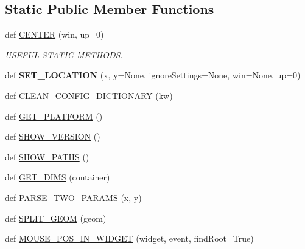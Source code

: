 \subsection*{Static Public Member Functions}
\begin{DoxyCompactItemize}
\item 
\mbox{\label{class_python_01_g_u_i_1_1appjar_1_1gui_ad5cb3ccb338fa2926c49bf320651215c}} 
def \hyperlink{class_python_01_g_u_i_1_1appjar_1_1gui_ad5cb3ccb338fa2926c49bf320651215c}{C\+E\+N\+T\+ER} (win, up=0)
\begin{DoxyCompactList}\small\item\em U\+S\+E\+F\+UL S\+T\+A\+T\+IC M\+E\+T\+H\+O\+DS. \end{DoxyCompactList}\item 
\mbox{\label{class_python_01_g_u_i_1_1appjar_1_1gui_ad884b956e474485ae442ac00e4064939}} 
def {\bfseries S\+E\+T\+\_\+\+L\+O\+C\+A\+T\+I\+ON} (x, y=None, ignore\+Settings=None, win=None, up=0)
\item 
def \hyperlink{class_python_01_g_u_i_1_1appjar_1_1gui_a66b9d5b2e9eb9b80ba8391c53abcf3ad}{C\+L\+E\+A\+N\+\_\+\+C\+O\+N\+F\+I\+G\+\_\+\+D\+I\+C\+T\+I\+O\+N\+A\+RY} (kw)
\item 
def \hyperlink{class_python_01_g_u_i_1_1appjar_1_1gui_aae5e88f35fbfacc1469e9c15df93f654}{G\+E\+T\+\_\+\+P\+L\+A\+T\+F\+O\+RM} ()
\item 
def \hyperlink{class_python_01_g_u_i_1_1appjar_1_1gui_a30977a1675121e381ad79eb21bcf46cb}{S\+H\+O\+W\+\_\+\+V\+E\+R\+S\+I\+ON} ()
\item 
def \hyperlink{class_python_01_g_u_i_1_1appjar_1_1gui_ae33437e9a0eca7e32c536fd2fca9bb45}{S\+H\+O\+W\+\_\+\+P\+A\+T\+HS} ()
\item 
def \hyperlink{class_python_01_g_u_i_1_1appjar_1_1gui_ab3febca0384cb45b7b119a8d4dae367f}{G\+E\+T\+\_\+\+D\+I\+MS} (container)
\item 
def \hyperlink{class_python_01_g_u_i_1_1appjar_1_1gui_ab64e0c4920c912ae567e1fa9dd3c0c9a}{P\+A\+R\+S\+E\+\_\+\+T\+W\+O\+\_\+\+P\+A\+R\+A\+MS} (x, y)
\item 
def \hyperlink{class_python_01_g_u_i_1_1appjar_1_1gui_a41b2873cd7755bdab3a946e5b1b555b4}{S\+P\+L\+I\+T\+\_\+\+G\+E\+OM} (geom)
\item 
def \hyperlink{class_python_01_g_u_i_1_1appjar_1_1gui_a8678fdbd7032d104cc192e2cfd256a8d}{M\+O\+U\+S\+E\+\_\+\+P\+O\+S\+\_\+\+I\+N\+\_\+\+W\+I\+D\+G\+ET} (widget, event, find\+Root=True)

\end{DoxyCompactItemize}
